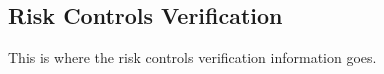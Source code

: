 \subsection{Risk Controls Verification}
This is where the risk controls verification information goes.
